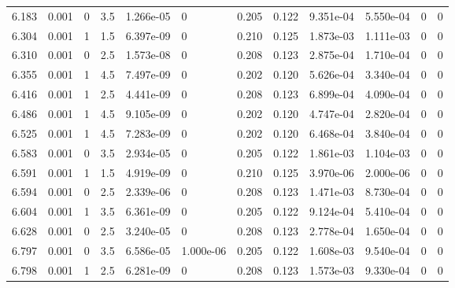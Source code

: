 \documentclass[preview]{standalone}
\begin{document}
{{\begin{tabular}{L{1.2cm}C{1.2cm} C{0.3cm}C{0.5cm} C{1.4cm}C{1.4cm} C{1.4cm}C{1.4cm} C{1.6cm}C{1.6cm} C{1.6cm}C{1.6cm}}
  6.183  &  0.001  & 0     & 3.5 &  1.266e-05  & 0  &  0.205&   0.122& 9.351e-04 & 5.550e-04   &  0 & 0  \\ 
  6.304  &  0.001  & 1     & 1.5 &  6.397e-09  & 0  &  0.210&   0.125& 1.873e-03 & 1.111e-03   &  0 & 0  \\ 
  6.310  &  0.001  & 0     & 2.5 &  1.573e-08  & 0  &  0.208&   0.123& 2.875e-04 & 1.710e-04   &  0 & 0  \\ 
  6.355  &  0.001  & 1     & 4.5 &  7.497e-09  & 0  &  0.202&   0.120& 5.626e-04 & 3.340e-04   &  0 & 0  \\ 
  6.416  &  0.001  & 1     & 2.5 &  4.441e-09  & 0  &  0.208&   0.123& 6.899e-04 & 4.090e-04   &  0 & 0  \\ 
  6.486  &  0.001  & 1     & 4.5 &  9.105e-09  & 0  &  0.202&   0.120& 4.747e-04 & 2.820e-04   &  0 & 0  \\ 
  6.525  &  0.001  & 1     & 4.5 &  7.283e-09  & 0  &  0.202&   0.120& 6.468e-04 & 3.840e-04   &  0 & 0  \\ 
  6.583  &  0.001  & 0     & 3.5 &  2.934e-05  & 0  &  0.205&   0.122& 1.861e-03 & 1.104e-03   &  0 & 0  \\ 
  6.591  &  0.001  & 1     & 1.5 &  4.919e-09  & 0  &  0.210&   0.125& 3.970e-06 & 2.000e-06   &  0 & 0  \\ 
  6.594  &  0.001  & 0     & 2.5 &  2.339e-06  & 0  &  0.208&   0.123& 1.471e-03 & 8.730e-04   &  0 & 0  \\ 
  6.604  &  0.001  & 1     & 3.5 &  6.361e-09  & 0  &  0.205&   0.122& 9.124e-04 & 5.410e-04   &  0 & 0  \\ 
  6.628  &  0.001  & 0     & 2.5 &  3.240e-05  & 0  &  0.208&   0.123& 2.778e-04 & 1.650e-04   &  0 & 0  \\ 
  6.797  &  0.001  & 0     & 3.5 &  6.586e-05  & 1.000e-06  &  0.205&   0.122& 1.608e-03 & 9.540e-04   &  0 & 0  \\ 
  6.798  &  0.001  & 1     & 2.5 &  6.281e-09  & 0  &  0.208&   0.123& 1.573e-03 & 9.330e-04   &  0 & 0  \\ 
\hline 
\end{tabular} 

}}
\end{document}
